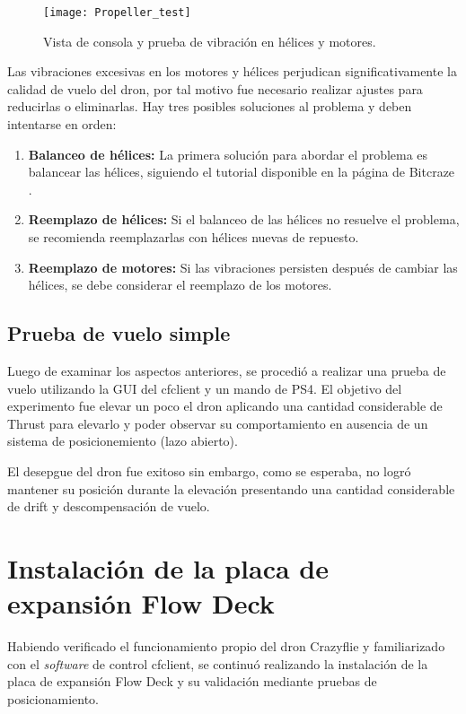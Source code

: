 \begin{figure}[htbp]
	\centering
	\texttt{[image: Propeller\_test]}
	\caption{Vista de consola y prueba de vibración en hélices y motores.}
	\label{fig:Propeller_test}
\end{figure} 

Las vibraciones excesivas en los motores y hélices perjudican significativamente la calidad de vuelo del dron, por tal motivo fue necesario realizar ajustes para reducirlas o eliminarlas. Hay tres posibles soluciones al problema y deben intentarse en orden:

\begin{enumerate}
	\item \textbf{Balanceo de hélices:} La primera solución para abordar el problema es balancear las hélices, siguiendo el tutorial disponible en la página de Bitcraze \cite{Crazyflie_balancing}.
	
	\item \textbf{Reemplazo de hélices:} Si el balanceo de las hélices no resuelve el problema, se recomienda reemplazarlas con hélices nuevas de repuesto.
	
	\item \textbf{Reemplazo de motores:} Si las vibraciones persisten después de cambiar las hélices, se debe considerar el reemplazo de los motores.
\end{enumerate}

\subsection{Prueba de vuelo simple}
Luego de examinar los aspectos anteriores, se procedió a realizar una prueba de vuelo utilizando la GUI del cfclient y un mando de PS4. El objetivo del experimento fue elevar un poco el dron aplicando una cantidad considerable de Thrust para elevarlo y poder observar su comportamiento en ausencia de un sistema de posicionemiento (lazo abierto). 

El desepgue del dron fue exitoso sin embargo, como se esperaba, no logró mantener su posición durante la elevación presentando una cantidad considerable de drift y descompensación de vuelo.

\section{Instalación de la placa de expansión Flow Deck}
Habiendo verificado el funcionamiento propio del dron Crazyflie y familiarizado con el \textit{software} de control cfclient, se continuó realizando la instalación de la placa de expansión Flow Deck y su validación mediante pruebas de posicionamiento.

